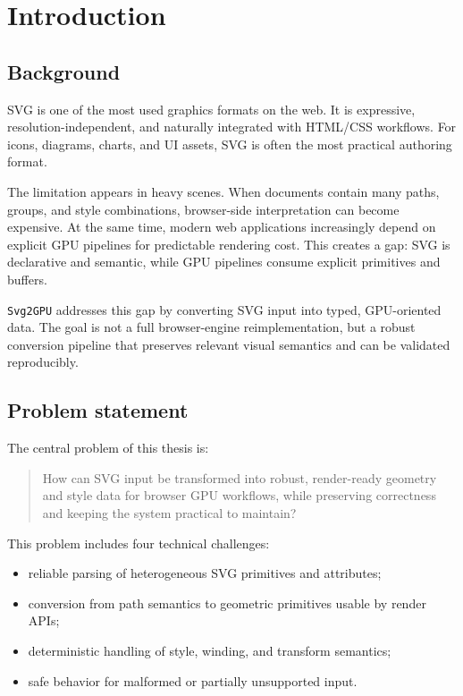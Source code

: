 \chapter{Introduction}
\label{chap:introduction}

\section{Background}

SVG is one of the most used graphics formats on the web.
It is expressive, resolution-independent, and naturally integrated with HTML/CSS workflows.
For icons, diagrams, charts, and UI assets, SVG is often the most practical authoring format.

The limitation appears in heavy scenes.
When documents contain many paths, groups, and style combinations, browser-side interpretation can become expensive.
At the same time, modern web applications increasingly depend on explicit GPU pipelines for predictable rendering cost.
This creates a gap: SVG is declarative and semantic, while GPU pipelines consume explicit primitives and buffers.

\texttt{Svg2GPU} addresses this gap by converting SVG input into typed, GPU-oriented data.
The goal is not a full browser-engine reimplementation, but a robust conversion pipeline that preserves relevant visual semantics and can be validated reproducibly.

\section{Problem statement}

The central problem of this thesis is:

\begin{quote}
How can SVG input be transformed into robust, render-ready geometry and style data for browser GPU workflows, while preserving correctness and keeping the system practical to maintain?
\end{quote}

This problem includes four technical challenges:

\begin{itemize}
\item reliable parsing of heterogeneous SVG primitives and attributes;
\item conversion from path semantics to geometric primitives usable by render APIs;
\item deterministic handling of style, winding, and transform semantics;
\item safe behavior for malformed or partially unsupported input.
\end{itemize}

